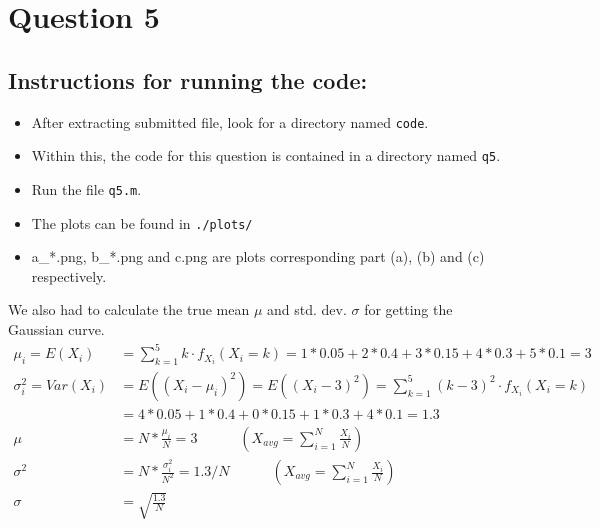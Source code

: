 \documentclass[11pt, fleqn]{article}
\begin{document}
\newpage
\section*{Question 5}
\setcounter{equation}{0}
\subsection*{Instructions for running the code:}
\begin{itemize}
    \item After extracting submitted file, look for a directory named \texttt{code}. 
    \item Within this, the code for this question is contained in a directory named \texttt{q5}.
    \item Run the file \texttt{q5.m}.
    \item The plots can be found in \texttt{./plots/}
    \item a\_*.png, b\_*.png and c.png are plots corresponding part (a), (b) and (c) respectively.
\end{itemize}

\vspace{3em}
We also had to calculate the true mean $\mu$ and std. dev. $\sigma$ for getting the Gaussian curve.
\begin{equation*}
    \begin{split}
        \mu_i = E(X_i) &= \sum_{k=1}^{5} k \cdot f_{X_i}(X_i = k) = 1*0.05 + 2*0.4 + 3*0.15 + 4*0.3 + 5*0.1 = 3 \\
        \sigma_i^2 = Var(X_i) &= E((X_i-\mu_i)^2) = E((X_i-3)^2)= \sum_{k=1}^{5} (k - 3)^2 \cdot f_{X_i}(X_i = k) \\
            &= 4*0.05 + 1*0.4 + 0*0.15 + 1*0.3 + 4*0.1 = 1.3 \\
        \mu &= N * \frac{\mu_i}{N} = 3 \hspace{3em} (X_{avg} = \sum_{i=1}^{N} \frac{X_i}{N}) \\
        \sigma^2 &= N * \frac{\sigma_i^2}{N^2} = 1.3 / N \hspace{3em} (X_{avg} = \sum_{i=1}^{N} \frac{X_i}{N}) \\
        \sigma &= \sqrt{\frac{1.3}{N}} \\
    \end{split}
\end{equation*}
\end{document}
